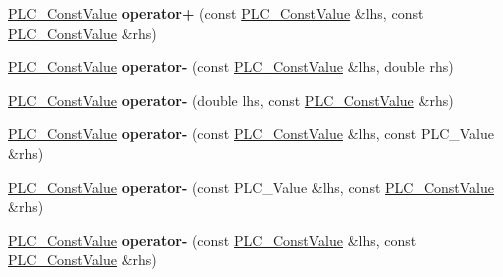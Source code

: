 \begin{DoxyCompactItemize}
\item 
\hypertarget{classns3_1_1PLC__ConstValue_a7e78c4959a18e3dadf425c21761572b3}{\hyperlink{classns3_1_1PLC__ConstValue}{\-P\-L\-C\-\_\-\-Const\-Value} {\bfseries operator+} (const \hyperlink{classns3_1_1PLC__ConstValue}{\-P\-L\-C\-\_\-\-Const\-Value} \&lhs, const \hyperlink{classns3_1_1PLC__ConstValue}{\-P\-L\-C\-\_\-\-Const\-Value} \&rhs)}\label{classns3_1_1PLC__ConstValue_a7e78c4959a18e3dadf425c21761572b3}

\item 
\hypertarget{classns3_1_1PLC__ConstValue_a80850554fde82496f52402fbc348b11f}{\hyperlink{classns3_1_1PLC__ConstValue}{\-P\-L\-C\-\_\-\-Const\-Value} {\bfseries operator-\/} (const \hyperlink{classns3_1_1PLC__ConstValue}{\-P\-L\-C\-\_\-\-Const\-Value} \&lhs, double rhs)}\label{classns3_1_1PLC__ConstValue_a80850554fde82496f52402fbc348b11f}

\item 
\hypertarget{classns3_1_1PLC__ConstValue_ad34f9a4f3cf54d24535f6a3b5ff92f1d}{\hyperlink{classns3_1_1PLC__ConstValue}{\-P\-L\-C\-\_\-\-Const\-Value} {\bfseries operator-\/} (double lhs, const \hyperlink{classns3_1_1PLC__ConstValue}{\-P\-L\-C\-\_\-\-Const\-Value} \&rhs)}\label{classns3_1_1PLC__ConstValue_ad34f9a4f3cf54d24535f6a3b5ff92f1d}

\item 
\hypertarget{classns3_1_1PLC__ConstValue_ae9f58a8f3258c7a4086891cab4bab9d7}{\hyperlink{classns3_1_1PLC__ConstValue}{\-P\-L\-C\-\_\-\-Const\-Value} {\bfseries operator-\/} (const \hyperlink{classns3_1_1PLC__ConstValue}{\-P\-L\-C\-\_\-\-Const\-Value} \&lhs, const \-P\-L\-C\-\_\-\-Value \&rhs)}\label{classns3_1_1PLC__ConstValue_ae9f58a8f3258c7a4086891cab4bab9d7}

\item 
\hypertarget{classns3_1_1PLC__ConstValue_a5fd0b786741c626b38ec4ba568c0dddc}{\hyperlink{classns3_1_1PLC__ConstValue}{\-P\-L\-C\-\_\-\-Const\-Value} {\bfseries operator-\/} (const \-P\-L\-C\-\_\-\-Value \&lhs, const \hyperlink{classns3_1_1PLC__ConstValue}{\-P\-L\-C\-\_\-\-Const\-Value} \&rhs)}\label{classns3_1_1PLC__ConstValue_a5fd0b786741c626b38ec4ba568c0dddc}

\item 
\hypertarget{classns3_1_1PLC__ConstValue_ae169ab68e7a01787514d74cbe8be9009}{\hyperlink{classns3_1_1PLC__ConstValue}{\-P\-L\-C\-\_\-\-Const\-Value} {\bfseries operator-\/} (const \hyperlink{classns3_1_1PLC__ConstValue}{\-P\-L\-C\-\_\-\-Const\-Value} \&lhs, const \hyperlink{classns3_1_1PLC__ConstValue}{\-P\-L\-C\-\_\-\-Const\-Value} \&rhs)}\label{classns3_1_1PLC__ConstValue_ae169ab68e7a01787514d74cbe8be9009}


\end{DoxyCompactItemize}
